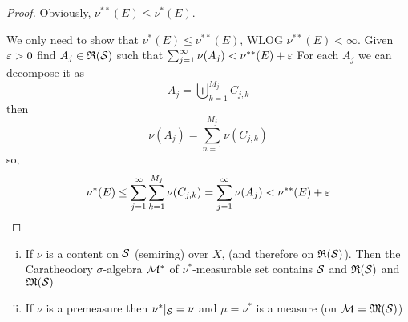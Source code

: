 \begin{proof}
  Obviously, $\nu^{**}(E) \le \nu^*(E)$. 

  We only need to show that $\nu^*(E) \le \nu^{**}(E)$, WLOG $\nu^{**}(E) < \infty$. 
  Given $\varepsilon > 0$ find $A_j \in \mathfrak R(\mathcal S)$ such that $\sum_{j=1}^\infty \nu(A_j) < \nu^{**}(E) + \varepsilon$
  For each $A_j$ we can decompose it as 
  \[A_j =\biguplus_{k=1}^{M_j} C_{j, k}\]
  then
  \[\nu(A_j) = \sum_{n=1}^{M_j} \nu(C_{j, k})\]
  so,
  \begin{align*}
    \nu^*(E) \le \sum_{j=1}^\infty\sum_{k=1}^{M_j} \nu(C_{j, k}) &= \sum_{j=1}^\infty \nu(A_j) < \nu^{**}(E) + \varepsilon \\
  \end{align*}  
\end{proof}

\begin{theorem} 
  \begin{enumerate}[(i)]
    \item If $\nu$ is a content on $\mathcal S$ (semiring) over $X$, (and therefore on $\mathfrak R(\mathcal S)$).  
      Then the Caratheodory $\sigma$-algebra $\mathcal M^*$ of $\nu^*$-measurable set contains $\mathcal S$ {and $\mathfrak R(\mathcal S)$} and $\mathfrak M(\mathcal S)$
    \item If $\nu$ is a premeasure then $\nu^*|_{\mathcal S} = \nu$
    and $\mu = \nu^*$ is a measure (on $\mathcal M=\mathfrak M(\mathcal S)$)
  \end{enumerate}
\end{theorem}


